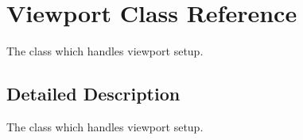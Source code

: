 \hypertarget{class_viewport}{\section{Viewport Class Reference}
\label{class_viewport}
}


The class which handles viewport setup.  




\subsection{Detailed Description}
The class which handles viewport setup. 

